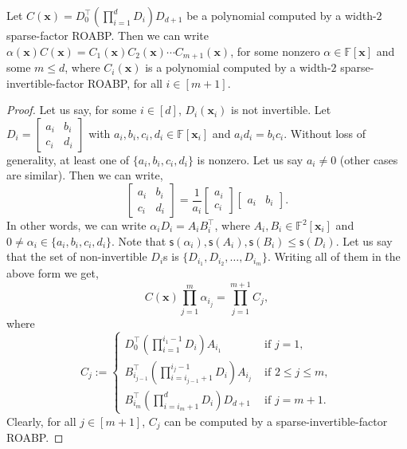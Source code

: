 \documentclass[final,oneeqnum, onethmnum, onefignum]{siamltex1213}
\newcommand{\F}{\mathbb F}
\renewcommand{\sp}{\mathsf{s}} %
\begin{document}
\begin{lemma}
\label{lem:width2}
Let $C(\mathbf{x}) =  D_0^{\top} \left( \prod_{i=1}^d D_i  \right) D_{d+1}$ be a polynomial computed
by a width-$2$ sparse-factor ROABP.
Then we can write $\alpha(\mathbf{x}) C(\mathbf{x}) = C_1(\mathbf{x})C_2(\mathbf{x}) \dotsm C_{m+1}(\mathbf{x})$,
for some nonzero $\alpha \in \F[\mathbf{x}]$ and some $m \leq d$, 
where $C_i(\mathbf{x})$ is a polynomial computed by a width-$2$ sparse-invertible-factor 
ROABP, for all $i \in [m+1]$. 
\end{lemma}
\begin{proof}
Let us say, for some $i \in [d]$, $D_i(\mathbf{x}_i)$ is not invertible. 
Let $D_i = \left[ \begin{smallmatrix} a_i & b_i \\ c_i & d_i \end{smallmatrix} \right]$ with
$a_i,b_i,c_i,d_i \in \F[\mathbf{x}_i]$ and $a_i d_i = b_i c_i$.
Without loss of generality, at least one of $\{a_i,b_i,c_i,d_i\}$ is nonzero. 
Let us say $a_i \neq 0$ (other cases are similar).
Then we can write,
$$ \begin{bmatrix} a_i & b_i \\ c_i & d_i \end{bmatrix} 
= \frac{1}{a_i} \begin{bmatrix} a_i \\ c_i  \end{bmatrix}
\begin{bmatrix} a_i & b_i \end{bmatrix} . 
$$ 
In other words, we can write
$\alpha_i D_i = A_i B_i^{\top} $, where $A_i,B_i \in \F^2[\mathbf{x}_i]$ and 
$0 \neq \alpha_i \in \{a_i,b_i,c_i,d_i\} $.
Note that $\sp(\alpha_i), \sp(A_i),\sp(B_i) \leq \sp(D_i)$.
Let us say that the set of non-invertible $D_i$s is $\{D_{i_1}, D_{i_2}, \dots, D_{i_{m}} \}$.
Writing all of them in the above form we get, 
$$C(\mathbf{x}) \prod_{j=1}^m \alpha_{i_j} = 
\prod_{j=1}^{m+1} C_j ,
$$
where 
\begin{equation*}
C_j := \begin{cases}
D_0^{\top} \left( \prod_{i=1}^{i_1-1} D_i \right) A_{i_1} & \text{ if } j= 1, \\
 B_{i_{j-1}}^{\top} \left(\prod_{i=i_{j-1}+1}^{i_{j}-1} D_i \right) A_{i_{j}}
& \text{ if } 2 \leq j \leq m, \\
B_{i_m}^{\top} \left( \prod_{i=i_m+1}^{d} D_i \right) D_{d+1} &  \text{ if } j = m+1. 
\end{cases}
\end{equation*}
Clearly, for all $j \in [m+1]$, $C_j$ can be computed by a sparse-invertible-factor ROABP.
\end{proof}
\end{document}
